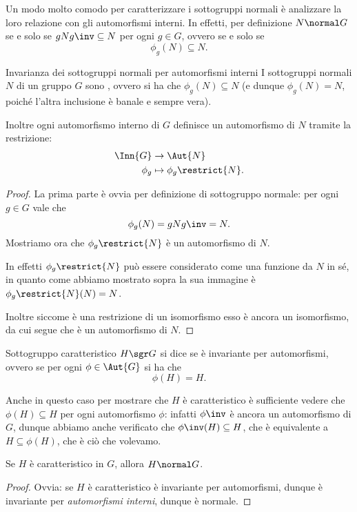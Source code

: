 Un modo molto comodo per caratterizzare i sottogruppi normali è analizzare la loro relazione con gli automorfismi interni. In effetti, per definizione $N \normal G$ se e solo se $gNg\inv \subseteq N$ per ogni $g \in G$, ovvero se e solo se \[
    \phi_g(N) \subseteq N.
\]

\begin{proposition}
    {Invarianza dei sottogruppi normali per automorfismi interni}{}
    I sottogruppi normali $N$ di un gruppo $G$ sono , ovvero si ha che $\phi_g(N) \subseteq N$ (e dunque $\phi_g(N) = N$, poiché l'altra inclusione è banale e sempre vera).

    Inoltre ogni automorfismo interno di $G$ definisce un automorfismo di $N$ tramite la restrizione: \begin{align*}
        \Inn{G} &\to \Aut{N}\\
        \phi_g &\mapsto \phi_{g}\restrict{N}.
    \end{align*}
\end{proposition}
\begin{proof}
    La prima parte è ovvia per definizione di sottogruppo normale: per ogni $g \in G$ vale che \[
        \phi_g(N) = gNg\inv = N.
    \] Mostriamo ora che $\phi_{g}\restrict{N}$ è un automorfismo di $N$. 
    
    In effetti $\phi_g\restrict{N}$ può essere considerato come una funzione da $N$ in sé, in quanto come abbiamo mostrato sopra la sua immagine è $\phi_g\restrict{N}(N) = N$. 
    
    Inoltre siccome è una restrizione di un isomorfismo esso è ancora un isomorfismo, da cui segue che è un automorfismo di $N$. 
\end{proof}

\begin{definition}
    {Sottogruppo caratteristico}{}
    $H \sgr G$ si dice  se è invariante per automorfismi, ovvero se per ogni $\phi \in \Aut{G}$ si ha che \[
        \phi(H) = H.
    \]  
\end{definition}

Anche in questo caso per mostrare che $H$ è caratteristico è sufficiente vedere che $\phi(H) \subseteq H$ per ogni automorfismo $\phi$: infatti $\phi\inv$ è ancora un automorfismo di $G$, dunque abbiamo anche verificato che $\phi\inv(H) \subseteq H$, che è equivalente a $H \subseteq \phi(H)$, che è ciò che volevamo.

\begin{proposition}
    {}{}
    Se $H$ è caratteristico in $G$, allora $H \normal G$. 
\end{proposition}
\begin{proof}
    Ovvia: se $H$ è caratteristico è invariante per automorfismi, dunque è invariante per \emph{automorfismi interni}, dunque è normale.
\end{proof}


